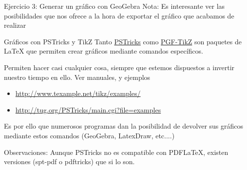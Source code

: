 \documentclass{beamer}
\begin{document}
\begin{frame}
\begin{exampleblock}{Ejercicio 3: Generar un gr\'afico con GeoGebra}
Nota: Es interesante ver las posibilidades que nos ofrece a la hora de exportar el gr\'afico
que acabamos de realizar
\end{exampleblock}
\end{frame}
\begin{frame}{Gr\'aficos con PSTricks y TikZ}
Tanto \href{http://www.ctan.org/pkg/pstricks}{PSTricks} como \href{http://www.texample.net/tikz/}{PGF-TikZ} son paquetes de LaTeX que permiten crear gr\'aficos mediante comandos espec\'ificos.

Permiten hacer casi cualquier cosa, siempre que estemos dispuestos a invertir nuestro tiempo en ello. Ver manuales, y ejemplos
\begin{itemize}
\item \href{http://www.texample.net/tikz/examples/}{http://www.texample.net/tikz/examples/}
\item \href{http://tug.org/PSTricks/main.cgi?file=examples}{http://tug.org/PSTricks/main.cgi?file=examples}
\end{itemize}

Es por ello que numerosos programas dan la posibilidad de devolver sus gr\'aficos mediante
estos comandos (GeoGebra, LatexDraw, etc....)

{\small Observaciones:
Aunque PSTricks no es compatible con PDFLaTeX, existen versiones (spt-pdf o pdftricks)
que si lo son.}


\end{frame}
\end{document}
